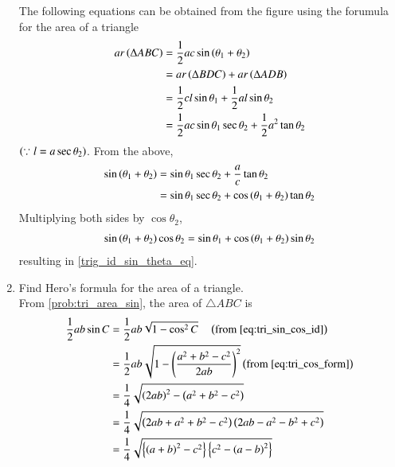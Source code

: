 \begin{enumerate}[label=\thesection.\arabic*.,ref=\thesection.\theenumi]
\solution The following equations can be obtained from the figure using the forumula for the area of a triangle
%
\begin{align}
ar \left(\Delta ABC\right) &= \frac{1}{2}ac \sin\left(\theta_1 + \theta_2\right) \\
&= ar \left(\Delta BDC\right) + ar \left(\Delta ADB\right) \\
&= \frac{1}{2}cl \sin{\theta_1} + \frac{1}{2}al \sin{\theta_2} \\ 
&= \frac{1}{2}ac \sin{\theta_1} \sec \theta_2 + \frac{1}{2}a^2 \tan{\theta_2} 
\end{align}
$\left(\because
	l = a \sec \theta_2\right)$.  From the above,
\begin{align}
\sin\left(\theta_1 + \theta_2\right) &=  \sin{\theta_1} \sec \theta_2 + \frac{a}{c} \tan{\theta_2} \\
	&=  \sin{\theta_1} \sec \theta_2 
+ \cos\left(\theta_1 + \theta_2\right) \tan{\theta_2} 
\end{align}
Multiplying both sides by $\cos \theta_2$,
\begin{align}
\sin\left(\theta_1 + \theta_2\right)\cos{\theta_2} =  \sin{\theta_1}  
+ \cos\left(\theta_1 + \theta_2\right) \sin\theta_2  
\end{align}
%
resulting in
\eqref{trig_id_sin_theta_eq}.
\item Find Hero's formula for the area of a triangle.
\\
\solution 
%
From \eqref{prob:tri_area_sin}, the area of $\triangle ABC$ is 
{\footnotesize
\begin{align}
\label{eq:tri_geo_area_sin_form}
 \frac{1}{2}ab\sin C
&=\frac{1}{2}ab\sqrt{1-\cos^2C} 
\quad \brak{\text{from } \eqref{eq:tri_sin_cos_id}
}
\\
&=\frac{1}{2}ab\sqrt{1-\brak{\frac{a^2+b^2-c^2}{2ab}}^2} \brak{\text{from } \eqref{eq:tri_cos_form}
}
\\
&=\frac{1}{4}\sqrt{\brak{2ab}^2-\brak{a^2+b^2-c^2}}
\\
&=\frac{1}{4}\sqrt{\brak{2ab+a^2+b^2-c^2}\brak{2ab-a^2-b^2+c^2}}
\\
&= \frac{1}{4}\sqrt{\cbrak{\brak{a+b}^2-c^2}\cbrak{c^2-\brak{a-b}^2}}

\end{align}}
\end{enumerate}
